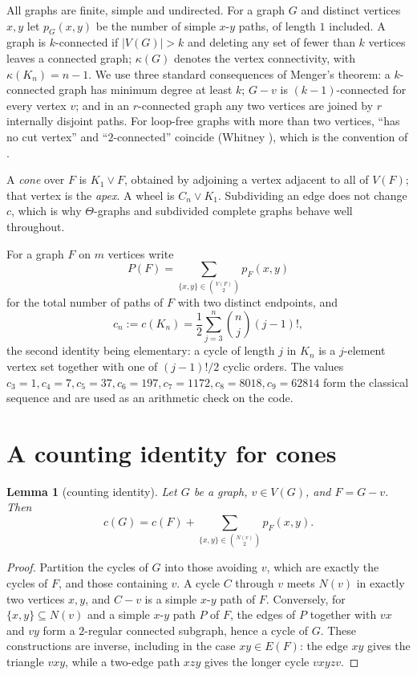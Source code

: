 \documentclass[11pt,a4paper]{article}
\newtheorem{lemma}[theorem]{Lemma}
\theoremstyle{definition}
\newcommand{\cG}{c(G)}
\newcommand{\cF}{c(F)}
\begin{document}
All graphs are finite, simple and undirected.  For a graph $G$ and distinct
vertices $x,y$ let $p_G(x,y)$ be the number of simple $x$-$y$ paths, of
length $1$ included.  A graph is $k$-connected if $|V(G)|>k$ and deleting any
set of fewer than $k$ vertices leaves a connected graph; $\kappa(G)$ denotes the
vertex connectivity, with $\kappa(K_n)=n-1$.  We use three standard
consequences of Menger's theorem: a $k$-connected graph has minimum degree at
least $k$; $G-v$ is $(k-1)$-connected for every vertex $v$; and in an
$r$-connected graph any two vertices are joined by $r$ internally disjoint
paths.  For loop-free graphs with more than two vertices, ``has no cut
vertex'' and ``$2$-connected'' coincide (Whitney \cite{whitney1932}), which is
the convention of \cite{mcculloch2026}.

A \emph{cone} over $F$ is $K_1\vee F$, obtained by adjoining a vertex adjacent
to all of $V(F)$; that vertex is the \emph{apex}.  A wheel is $C_n\vee K_1$.
Subdividing an edge does not change $c$, which is why $\Theta$-graphs and
subdivided complete graphs behave well throughout.

For a graph $F$ on $m$ vertices write
\[
  P(F) = \sum_{\{x,y\}\in\binom{V(F)}{2}} p_F(x,y)
\]
for the total number of paths of $F$ with two distinct endpoints, and
\[
  c_n := c(K_n) = \frac12\sum_{j=3}^{n}\binom nj (j-1)! ,
\]
the second identity being elementary: a cycle of length $j$ in $K_n$ is a
$j$-element vertex set together with one of $(j-1)!/2$ cyclic orders.  The
values $c_3=1, c_4=7, c_5=37, c_6=197, c_7=1172, c_8=8018, c_9=62814$ form the
classical sequence \cite{oeisA002807} and are used as an arithmetic check on
the code.

\section{A counting identity for cones}\label{sec:cone}

\begin{lemma}[counting identity]\label{lem:cone}
Let $G$ be a graph, $v\in V(G)$, and $F=G-v$.  Then
\[
  \cG = \cF + \sum_{\{x,y\}\in\binom{N(v)}{2}} p_F(x,y).
\]
\end{lemma}

\begin{proof}
Partition the cycles of $G$ into those avoiding $v$, which are exactly the
cycles of $F$, and those containing $v$.  A cycle $C$ through $v$ meets $N(v)$
in exactly two vertices $x,y$, and $C-v$ is a simple $x$-$y$ path of $F$.
Conversely, for $\{x,y\}\subseteq N(v)$ and a simple $x$-$y$ path $P$ of $F$,
the edges of $P$ together with $vx$ and $vy$ form a $2$-regular connected
subgraph, hence a cycle of $G$.  These constructions are inverse, including in
the case $xy\in E(F)$: the edge $xy$ gives the triangle $vxy$, while a
two-edge path $xzy$ gives the longer cycle $vxyzv$.
\end{proof}
\end{document}
